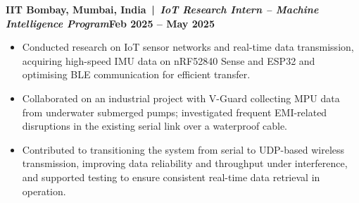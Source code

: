 \documentclass[10pt,letterpaper]{article}
\newcommand{\role}[2]{\par\vspace{4pt}\textbf{#1}\hfill\textbf{#2}\par}
\begin{document}
\role{IIT Bombay, Mumbai, India \,|\, \textit{IoT Research Intern -- Machine Intelligence Program}}{Feb 2025 -- May 2025}
\begin{itemize}
\item Conducted research on IoT sensor networks and real-time data transmission, acquiring high-speed IMU data on nRF52840 Sense and ESP32 and optimising BLE communication for efficient transfer.
\item Collaborated on an industrial project with V-Guard collecting MPU data from underwater submerged pumps; investigated frequent EMI-related disruptions in the existing serial link over a waterproof cable.
\item Contributed to transitioning the system from serial to UDP-based wireless transmission, improving data reliability and throughput under interference, and supported testing to ensure consistent real-time data retrieval in operation.
\end{itemize}
\end{document}
